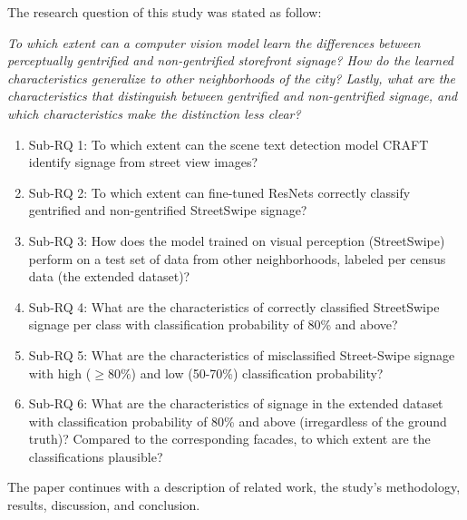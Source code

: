 The research question of this study was stated as follow: 

\noindent\textit{To which extent can a computer vision model learn the differences between perceptually gentrified and non-gentrified storefront signage? How do the learned characteristics generalize to other neighborhoods of the city? Lastly, what are the characteristics that distinguish between gentrified and non-gentrified signage, and which characteristics make the distinction less clear?}

\begin{enumerate}
    \item Sub-RQ 1: To which extent can the scene text detection model CRAFT identify signage from street view images?
    \item Sub-RQ 2: To which extent can fine-tuned ResNets correctly classify gentrified and non-gentrified StreetSwipe signage?
    \item Sub-RQ 3: How does the model trained on visual perception (StreetSwipe) perform on a test set of data from other neighborhoods, labeled per census data (the extended dataset)?
    \item Sub-RQ 4: What are the characteristics of correctly classified StreetSwipe signage per class with classification probability of 80\% and above?
    \item Sub-RQ 5: What are the characteristics of misclassified Street-Swipe signage with high ($ \geq 80\% $) and low (50-70\%) classification probability?
    \item Sub-RQ 6: What are the characteristics of signage in the extended dataset with classification probability of 80\% and above (irregardless of the ground truth)? Compared to the corresponding facades, to which extent are the classifications plausible?
\end{enumerate}

The paper continues with a description of related work, the study's methodology, results, discussion, and conclusion.